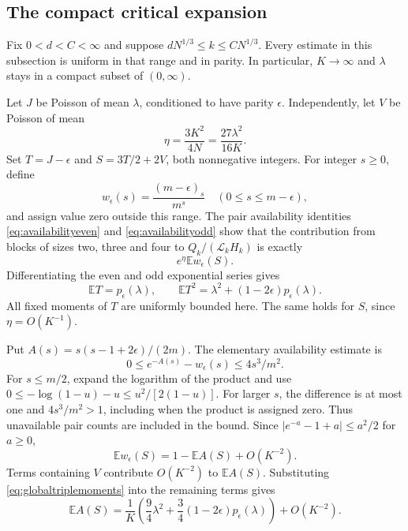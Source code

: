 \documentclass[11pt]{article}
\theoremstyle{definition}
\theoremstyle{remark}
\newcommand{\E}{\mathbb E}
\newcommand{\1}{\mathbf 1}
\begin{document}
\subsection{The compact critical expansion}

Fix $0<d<C<\infty$ and suppose $dN^{1/3}\le k\le CN^{1/3}$. Every estimate in this subsection is uniform in that range and in parity. In particular, $K\to\infty$ and $\lambda$ stays in a compact subset of $(0,\infty)$.

Let $J$ be Poisson of mean $\lambda$, conditioned to have parity $\epsilon$. Independently, let $V$ be Poisson of mean
\[
\eta=\frac{3K^2}{4N}=\frac{27\lambda^2}{16K}.
\]
Set $T=J-\epsilon$ and $S=3T/2+2V$, both nonnegative integers. For integer $s\ge0$, define
\[
w_\epsilon(s)=\frac{(m-\epsilon)_s}{m^s}
\quad(0\le s\le m-\epsilon),
\]
and assign value zero outside this range. The pair availability identities \eqref{eq:availabilityeven} and \eqref{eq:availabilityodd} show that the contribution from blocks of sizes two, three and four to $Q_k/(\mathcal L_kH_k)$ is exactly
\begin{equation}\label{eq:globalconditioned}
e^\eta\E w_\epsilon(S).
\end{equation}
Differentiating the even and odd exponential series gives
\begin{equation}\label{eq:globaltriplemoments}
\E T=p_\epsilon(\lambda),\qquad
\E T^2=\lambda^2+(1-2\epsilon)p_\epsilon(\lambda).
\end{equation}
All fixed moments of $T$ are uniformly bounded here. The same holds for $S$, since $\eta=O(K^{-1})$.

Put $A(s)=s(s-1+2\epsilon)/(2m)$. The elementary availability estimate is
\[
0\le e^{-A(s)}-w_\epsilon(s)\le4s^3/m^2.
\]
For $s\le m/2$, expand the logarithm of the product and use
$0\le-\log(1-u)-u\le u^2/[2(1-u)]$. For larger $s$, the difference is at most one and $4s^3/m^2>1$, including when the product is assigned zero. Thus unavailable pair counts are included in the bound. Since $|e^{-a}-1+a|\le a^2/2$ for $a\ge0$,
\[
\E w_\epsilon(S)=1-\E A(S)+O(K^{-2}).
\]
Terms containing $V$ contribute $O(K^{-2})$ to $\E A(S)$. Substituting \eqref{eq:globaltriplemoments} into the remaining terms gives
\begin{equation}\label{eq:globalavailabilitymean}
\E A(S)=\frac1K\left(\frac94\lambda^2
+\frac34(1-2\epsilon)p_\epsilon(\lambda)\right)+O(K^{-2}).
\end{equation}
\end{document}

